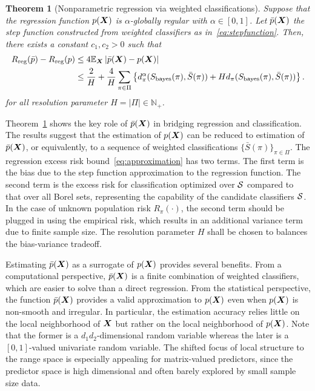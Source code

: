 \documentclass[11pt]{article}
\theoremstyle{plain}
\newtheorem{thm}{Theorem}
\theoremstyle{definition}
\def\bayesS{S_{\textup{bayes}}}
\begin{document}
\begin{thm}[Nonparametric regression via weighted classifications]\label{thm:twobounds} Suppose that the regression function $p(\bm X)$ is $\alpha$-globally regular with $\alpha\in[0,1]$. Let $\bar p(\bm X)$ the step function constructed from weighted classifiers as in~\eqref{eq:stepfunction}. Then, there exists a constant $c_1,c_2>0$ such that
\begin{align}\label{eq:approximation}
R_{\textup{reg}}(\bar p) - R_{\textup{reg}}(p)&\leq 4\mathbb{E}_{\mX}\left| \bar p(\mX)- p(\mX)\right|\notag\\
&\leq {2\over H}+ \frac{4}{H}\sum_{\pi\in\Pi}\left\{d_\pi^{\alpha}(\bayesS(\pi),\bar S(\pi))+ H d_\pi(\bayesS(\pi),\bar S(\pi))\right\}.
\end{align}
for all resolution parameter $H=|\Pi|\in \mathbb{N}_{+}$. 

\end{thm}

Theorem~\ref{thm:twobounds} shows the key role of $\bar p(\bm X)$ in bridging regression and classification. The results suggest that the estimation of $p(\bm X)$ can be reduced to estimation of $\bar p(\bm X)$, or equivalently, to a sequence of weighted classifications $\{\bar S(\pi)\}_{\pi\in\Pi}$. The regression excess risk bound~\eqref{eq:approximation} has two terms. The first term is the bias due to the step function approximation to the regression function. The second term is the excess risk for classification optimized over $\mathcal{S}$ compared to that over all Borel sets, representing the capability of the candidate classifiers $\mathcal{S}$. In the case of unknown population risk $R_\pi(\cdot)$, the second term should be plugged in using the empirical risk, which results in an additional variance term due to finite sample size. The resolution parameter $H$ shall be chosen to balances the bias-variance tradeoff. 

Estimating $\bar p(\bm X)$ as a surrogate of $p(\bm X)$ provides several benefits. From a computational perspective, $\bar p(\bm X)$ is a finite combination of weighted classifiers, which are easier to solve than a direct regression. From the statistical perspective, the function $\bar p(\bm X)$ provides a valid approximation to $p(\bm X)$ even when $p(\bm X)$ is non-smooth and irregular. In particular, the estimation accuracy relies little on the local neighborhood of $\bm X$ but rather on the local neighborhood of $p(\bm X)$. Note that the former is a $d_1d_2$-dimensional random variable whereas the later is a $[0,1]$-valued univariate random variable. The shifted focus of local structure to the range space is especially appealing for matrix-valued predictors, since the predictor space is high dimensional and often barely explored by small sample size data.  
\end{document}

